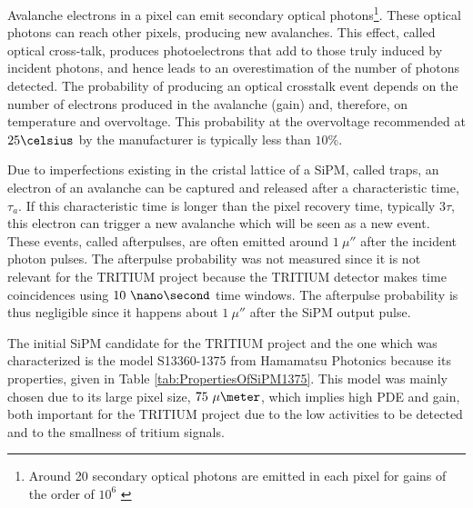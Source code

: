 Avalanche electrons in a pixel can emit secondary optical photons\footnote{Around 20 secondary optical photons are emitted in each pixel for gains of the order of $10^6$ \cite{CrosstalkProbability}}. These optical photons can reach other pixels, producing new avalanches. This effect, called optical cross-talk, produces photoelectrons that add to those truly induced by incident photons, and hence leads to an overestimation of the number of photons detected. The probability of producing an optical crosstalk event depends on the number of electrons produced in the avalanche (gain) and, therefore, on temperature and overvoltage. This probability at the overvoltage recommended at $25\celsius$ by the manufacturer is typically less than $10\%$.


Due to imperfections existing in the cristal lattice of a SiPM, called traps, an electron of an avalanche can be captured and released after a characteristic time, $\tau_a$. If this characteristic time is longer than the pixel recovery time, typically $3\tau$, this electron can trigger a new avalanche which will be seen as a new event. These events, called  afterpulses, are often emitted around $1~\mu\second$ after the incident photon pulses. The afterpulse probability was not measured since it is not relevant for the TRITIUM project because the TRITIUM detector makes time coincidences using $10~\nano\second$ time windows. The afterpulse probability is thus negligible since it happens about $1~\mu\second$ after the SiPM output pulse.

The initial SiPM candidate for the TRITIUM project and the one which was characterized is the model S13360-1375 from Hamamatsu Photonics \cite{DataSheetHammamatsu_1_SiPM_1375} because its properties, given in Table \ref{tab:PropertiesOfSiPM1375}. This model was mainly chosen due to its large pixel size, $75~\mu\meter$, which implies high PDE and gain, both important for the TRITIUM project due to the low activities to be detected and to the smallness of tritium signals. %

